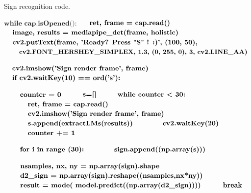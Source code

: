 \documentclass[lettersize,journal]{IEEEtran}
\begin{document}
\begin{algorithm}[H]
\caption{Sign recognition code.}\label{alg:alg1}
\begin{algorithmic}
\STATE 
\STATE \hspace{0.5cm}$ \textbf{while cap.isOpened(): }  $
\STATE \hspace{0.5cm}$ \textbf{\quad ret, frame = cap.read() }  $
\STATE \hspace{0.5cm}$ \textbf{\quad image, results = mediapipe\_det(frame, holistic) }  $
\STATE \hspace{0.5cm}$ \textbf{\quad cv2.putText(frame, 'Ready? Press "S" ! :)', (100, 50), }  $
\STATE \hspace{0.5cm}$ \textbf{\quad \quad cv2.FONT\_HERSHEY\_SIMPLEX, 1.3, (0, 255, 0), 3, cv2.LINE\_AA) }  $

\STATE \hspace{0.5cm}$ \textbf{\quad cv2.imshow('Sign render frame', frame) }  $
\STATE \hspace{0.5cm}$ \textbf{\quad if cv2.waitKey(10) == ord('s'): }  $

\STATE \hspace{0.5cm}$ \textbf{\quad \quad counter = 0 }  $
\STATE \hspace{0.5cm}$ \textbf{\quad \quad s=[] }  $
\STATE \hspace{0.5cm}$ \textbf{\quad \quad while counter < 30: }  $
\STATE \hspace{0.5cm}$ \textbf{\quad \quad \quad ret, frame = cap.read() }  $
\STATE \hspace{0.5cm}$ \textbf{\quad \quad \quad cv2.imshow('Sign render frame', frame) }  $
\STATE \hspace{0.5cm}$ \textbf{\quad \quad \quad s.append(extractLMs(results)) }  $
\STATE \hspace{0.5cm}$ \textbf{\quad \quad  \quad cv2.waitKey(20) }  $
\STATE \hspace{0.5cm}$ \textbf{\quad \quad \quad counter += 1 }  $

\STATE \hspace{0.5cm}$ \textbf{\quad \quad for i in range (30): }  $
\STATE \hspace{0.5cm}$ \textbf{\quad \quad  \quad sign.append((np.array(s))) }  $

\STATE \hspace{0.5cm}$ \textbf{\quad \quad nsamples, nx, ny = np.array(sign).shape }  $
\STATE \hspace{0.5cm}$ \textbf{\quad \quad d2\_sign = np.array(sign).reshape((nsamples,nx*ny))   }  $
\STATE \hspace{0.5cm}$ \textbf{\quad \quad result = mode( model.predict((np.array(d2\_sign)))) }  $
\STATE \hspace{0.5cm}$ \textbf{\quad \quad break }  $


\end{algorithmic}
\label{alg1}
\end{algorithm}
\end{document}
